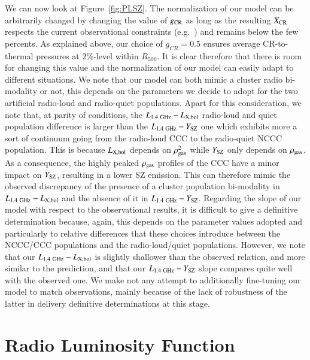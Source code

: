 \documentclass[traditabstract]{aa}
\newcommand{\rmn}{\mathrm}
\begin{document}
We can now look at Figure~\ref{fig:PLSZ}. The normalization of our model can be arbitrarily changed by changing the value of $g_{\rm{CR}}$ as long as the resulting $X_{\rm{CR}}$ respects the current observational constraints (e.g.~\citealp{2011arXiv1111.5544M}) and remains below the few percents. As explained above, our choice of $g_{CR}=0.5$ ensures average CR-to-thermal pressures at $2\%$-level within $R_{500}$. It is clear therefore that there is room for changing this value and the normalization of our model can easily adapt to different situations. We note that our model can both mimic a cluster radio bi-modality or not, this depends on the parameters we decide to adopt for the two artificial radio-loud and radio-quiet populations. Apart for this consideration, we note that, at parity of conditions, the $L_{1.4~\rmn{GHz}}-L_{\rm{X,bol}}$ radio-loud and quiet population difference is larger than the $L_{1.4~\rmn{GHz}}-Y_{\rm{SZ}}$ one which exhibits more a sort of continuum going from the radio-loud CCC to the radio-quiet NCCC population. This is because $L_{\rm{X,bol}}$ depends on $\rho_{\rm{gas}}^2$ while $Y_{\rm{SZ}}$ only depends on $\rho_{\rm{gas}}$. As a consequence, the highly peaked $\rho_{\rm{gas}}$ profiles of the CCC have a minor impact on $Y_{\rm{SZ}}$, resulting in a lower SZ emission. This can therefore mimic the observed discrepancy of the presence of a cluster population bi-modality  in $L_{1.4~\rmn{GHz}}-L_{\rm{X,bol}}$ and the absence of it in $L_{1.4~\rmn{GHz}}-Y_{\rm{SZ}}$. Regarding the slope of our model with respect to the observational results, it is difficult to give a definitive determination because, again, this depends on the parameter values adopted and particularly to relative differences that these choices introduce between the NCCC/CCC populations and the radio-loud/quiet populations. However, we note that our $L_{1.4~\rmn{GHz}}-L_{\rm{X,bol}}$ is slightly shallower than the observed relation, and more similar to the \cite{2009JCAP...09..024K} prediction, and that our $L_{1.4~\rmn{GHz}}-Y_{\rm{SZ}}$ slope compares quite well with the observed one. We make not any attempt to additionally fine-tuning our model to match observations, mainly because of the lack of robustness of the latter in delivery definitive determinations at this stage. 


\section{Radio Luminosity Function}
\label{sec:5}
\end{document}
